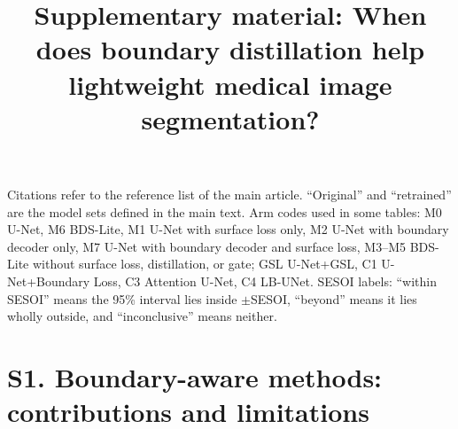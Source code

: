 \documentclass[10pt]{article}
\title{Supplementary material: When does boundary distillation help lightweight medical image segmentation?}
\date{}
\begin{document}
\maketitle
\noindent Citations refer to the reference list of the main article. ``Original'' and ``retrained'' are the model sets defined in the main text. Arm codes used in some tables: M0 U-Net, M6 BDS-Lite, M1 U-Net with surface loss only, M2 U-Net with boundary decoder only, M7 U-Net with boundary decoder and surface loss, M3--M5 BDS-Lite without surface loss, distillation, or gate; GSL U-Net+GSL, C1 U-Net+Boundary Loss, C3 Attention U-Net, C4 LB-UNet. SESOI labels: ``within SESOI'' means the 95\% interval lies inside $\pm$SESOI, ``beyond'' means it lies wholly outside, and ``inconclusive'' means neither.

\section*{S1. Boundary-aware methods: contributions and limitations}
\end{document}

